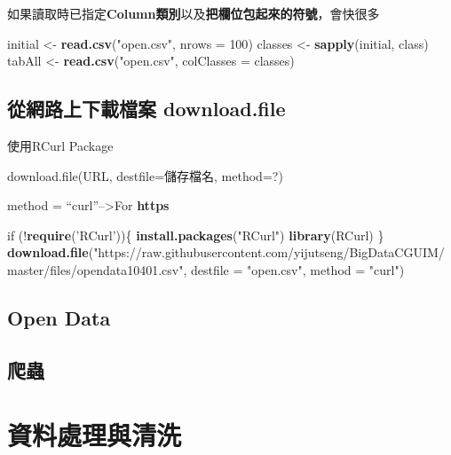 \documentclass[]{book}
\newenvironment{Shaded}{\begin{snugshade}}{\end{snugshade}}
\newcommand{\KeywordTok}[1]{\textcolor[rgb]{0.13,0.29,0.53}{\textbf{{#1}}}}
\newcommand{\DataTypeTok}[1]{\textcolor[rgb]{0.13,0.29,0.53}{{#1}}}
\newcommand{\DecValTok}[1]{\textcolor[rgb]{0.00,0.00,0.81}{{#1}}}
\newcommand{\StringTok}[1]{\textcolor[rgb]{0.31,0.60,0.02}{{#1}}}
\newcommand{\NormalTok}[1]{{#1}}
\theoremstyle{definition}
\theoremstyle{definition}
\theoremstyle{remark}
\begin{document}
如果讀取時已指定\textbf{Column類別}以及\textbf{把欄位包起來的符號}，會快很多

\begin{Shaded}
\begin{Highlighting}[]
\NormalTok{initial <-}\StringTok{ }\KeywordTok{read.csv}\NormalTok{(}\StringTok{"open.csv"}\NormalTok{, }\DataTypeTok{nrows =} \DecValTok{100}\NormalTok{)}
\NormalTok{classes <-}\StringTok{ }\KeywordTok{sapply}\NormalTok{(initial, class)}
\NormalTok{tabAll <-}\StringTok{ }\KeywordTok{read.csv}\NormalTok{(}\StringTok{"open.csv"}\NormalTok{, }\DataTypeTok{colClasses =} \NormalTok{classes)}
\end{Highlighting}
\end{Shaded}

\section{從網路上下載檔案 download.file}\label{-download.file}

使用RCurl Package

download.file(URL, destfile=儲存檔名, method=?)

method = ``curl''--\textgreater{}For \textbf{https}

\begin{Shaded}
\begin{Highlighting}[]
\NormalTok{if (!}\KeywordTok{require}\NormalTok{(}\StringTok{'RCurl'}\NormalTok{))\{}
    \KeywordTok{install.packages}\NormalTok{(}\StringTok{"RCurl"}\NormalTok{)}
    \KeywordTok{library}\NormalTok{(RCurl)}
\NormalTok{\}}
\KeywordTok{download.file}\NormalTok{(}\StringTok{"https://raw.githubusercontent.com/yijutseng/BigDataCGUIM/master/files/opendata10401.csv"}\NormalTok{, }
              \DataTypeTok{destfile =} \StringTok{"open.csv"}\NormalTok{, }\DataTypeTok{method =} \StringTok{"curl"}\NormalTok{)}
\end{Highlighting}
\end{Shaded}

\section{Open Data}\label{open-data-1}

\section{爬蟲}

\chapter{資料處理與清洗}\label{manipulation}
\end{document}
